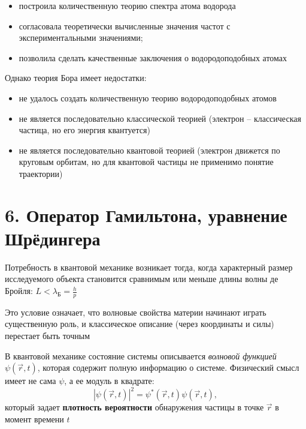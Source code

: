 \documentclass[12pt]{article}
\begin{document}
\begin{itemize}
    \item построила количественную теорию спектра атома водорода
    \item согласовала теоретически вычисленные значения частот с экспериментальными значениями;
    \item позволила сделать качественные заключения о водородоподобных атомах
\end{itemize}

Однако теория Бора имеет недостатки:

\begin{itemize}
    \item не удалось создать количественную теорию водородоподобных атомов
    \item не является последовательно классической теорией (электрон -- классическая частица, но его энергия квантуется)
    \item не является последовательно квантовой теорией (электрон движется по круговым орбитам, но для квантовой частицы не применимо понятие траектории)
\end{itemize}








\section{6. Оператор Гамильтона, уравнение Шрёдингера}

Потребность в квантовой механике возникает тогда, когда характерный размер исследуемого объекта становится сравнимым или меньше длины волны де Бройля: $L < \lambda_{\text{Б}} = \frac{h}{p}$

Это условие означает, что волновые свойства материи начинают играть существенную роль, и классическое описание (через координаты и силы) перестает быть точным

\mediumvspace

В квантовой механике состояние системы описывается \textit{волновой функцией} $\psi(\vec r, t)$, которая содержит полную информацию о системе.  
Физический смысл имеет не сама $\psi$, а ее модуль в квадрате:
\[
|\psi(\vec r, t)|^2 = \psi^*(\vec r, t)\psi(\vec r, t),
\]
который задает \textbf{плотность вероятности} обнаружения частицы в точке $\vec r$ в момент времени $t$

\mediumvspace
\end{document}
